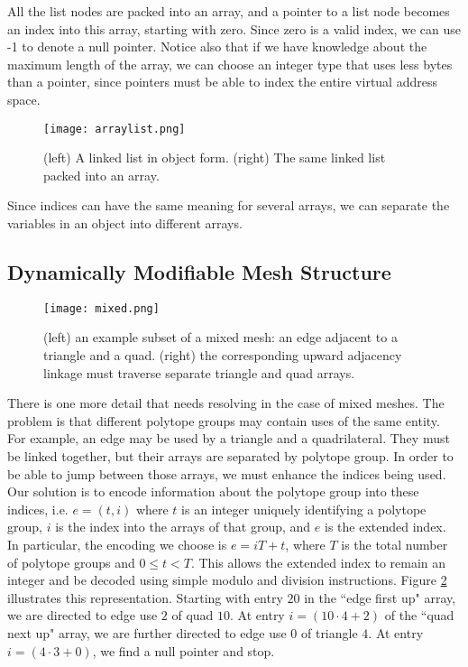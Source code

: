 All the list nodes are packed into an array, and a pointer to
a list node becomes an index into this array, starting with zero.
Since zero is a valid index, we can use -1 to denote a null pointer.
Notice also that if we have knowledge about the maximum length
of the array, we can choose an integer type that uses less bytes
than a pointer, since pointers must be able to index the entire
virtual address space.

\begin{figure}
\begin{center}
\texttt{[image: arraylist.png]}
\caption{(left) A linked list in object form.
(right) The same linked list packed into an array.}
\label{fig:arraylist}
\end{center}
\end{figure}

Since indices can have the same meaning for several arrays,
we can separate the variables in an object into different
arrays.

\subsection{Dynamically Modifiable Mesh Structure}
\label{sec:sisc_mstruct}

\begin{figure}
\begin{center}
\texttt{[image: mixed.png]}
\caption{(left) an example subset of a mixed mesh:
an edge adjacent to a triangle and a quad.
(right) the corresponding upward adjacency linkage
must traverse separate triangle and quad arrays.}
\label{fig:mixed}
\end{center}
\end{figure}

There is one more detail that needs resolving in the
case of mixed meshes.
The problem is that different polytope
groups may contain uses of the same entity.
For example, an edge may be used by a triangle and a quadrilateral.
They must be linked together, but their arrays are
separated by polytope group.
In order to be able to jump between those arrays, we must
enhance the indices being used.
Our solution is to encode information about the polytope group
into these indices, i.e. $e = (t,i)$ where $t$ is an integer
uniquely identifying a polytope group, $i$ is the index
into the arrays of that group, and $e$ is the extended index.
In particular, the encoding we choose is $e = iT + t$, where
$T$ is the total number of polytope groups and $0\leq t < T$.
This allows the extended index to remain an integer
and be decoded using simple modulo and division instructions.
Figure \ref{fig:mixed} illustrates this representation.
Starting with entry $20$ in the ``edge first up" array,
we are directed to edge use $2$ of quad $10$.
At entry $i=(10\cdot 4 + 2)$ of the ``quad next up" array,
we are further directed to edge use $0$ of triangle $4$.
At entry $i=(4\cdot 3 + 0)$, we find a null pointer and stop.

